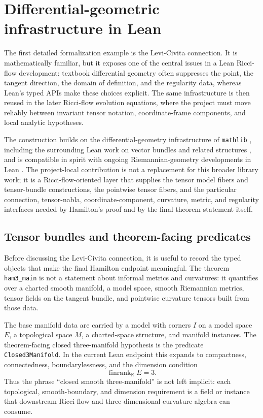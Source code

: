 \documentclass[11pt]{article}
\theoremstyle{plain}
\theoremstyle{definition}
\theoremstyle{remark}
\newcommand{\leanref}[1]{\nolinkurl{#1}}
\begin{document}
\section{Differential-geometric infrastructure in Lean}

The first detailed formalization example is the Levi-Civita connection.  It is
mathematically familiar, but it exposes one of the central issues in a Lean
Ricci-flow development: textbook differential geometry often suppresses the
point, the tangent direction, the domain of definition, and the regularity data,
whereas Lean's typed APIs make these choices explicit.  The same infrastructure
is then reused in the later Ricci-flow evolution equations, where the project
must move reliably between invariant tensor notation, coordinate-frame
components, and local analytic hypotheses.

The construction builds on the differential-geometry infrastructure of
\texttt{mathlib} \cite{mathlib}, including the surrounding Lean work on vector
bundles and related structures \cite{BordgCavalleriDGLean}, and is compatible in
spirit with ongoing Riemannian-geometry developments in Lean
\cite{RothgangDGMathlib}.  The project-local contribution is not a replacement
for this broader library work; it is a Ricci-flow-oriented layer that supplies
the tensor model fibers and tensor-bundle constructions, the pointwise tensor
fibers, and the particular connection, tensor-nabla, coordinate-component,
curvature, metric, and regularity interfaces needed by Hamilton's proof and by
the final theorem statement itself.

\subsection{Tensor bundles and theorem-facing predicates}

Before discussing the Levi-Civita connection, it is useful to record the typed
objects that make the final Hamilton endpoint meaningful.  The theorem
\leanref{ham3_main} is not a statement about informal metrics and curvatures:
it quantifies over a charted smooth manifold, a model space, smooth
Riemannian metrics, tensor fields on the tangent bundle, and pointwise
curvature tensors built from those data.

The base manifold data are carried by a model with corners \(I\) on a model
space \(E\), a topological space \(M\), a charted-space structure, and manifold
instances.  The theorem-facing closed three-manifold hypothesis is the
predicate \leanref{Closed3Manifold}.
In the current Lean endpoint this expands to compactness, connectedness,
boundarylessness, and the dimension condition
\[
  \operatorname{finrank}_{\mathbb R} E = 3 .
\]
Thus the phrase ``closed smooth three-manifold'' is not left implicit: each
topological, smooth-boundary, and dimension requirement is a field or instance
that downstream Ricci-flow and three-dimensional curvature algebra can consume.
\end{document}
